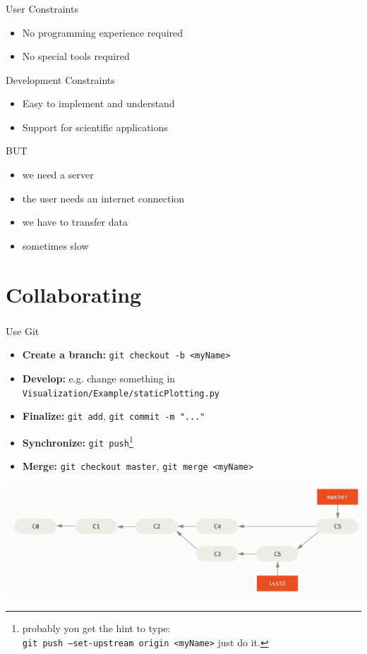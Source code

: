 \documentclass[11pt]{beamer}
\newcommand{\cmark}{\ding{51}}%
\newcommand{\citem}{\item[\textcolor{olive}{\cmark}]}
\newcommand{\mytexttt}[1]{\colorbox{gray!20}{\texttt{#1}}}
\begin{document}
\begin{frame}
\frametitle{\insertsubsection}
\begin{block}{User Constraints}
\begin{itemize}
\citem No programming experience required
\citem No special tools required
\end{itemize}
\end{block}

\begin{block}{Development Constraints}
\begin{itemize}
\citem Easy to implement and understand
\citem Support for scientific applications
\end{itemize}
\end{block}

\begin{block}{BUT}
\begin{itemize}
\item we need a server
\item the user needs an internet connection
\item we have to transfer data
\item sometimes slow
\end{itemize}
\end{block}
\end{frame}

\section{Collaborating}
\frametitle{\insertsubsection}
\begin{frame}
\begin{block}{Use Git}
\begin{itemize}
\item \textbf{Create a branch:} \mytexttt{git checkout -b <myName>}
\item \textbf{Develop:} e.g. change something in \mytexttt{Visualization/Example/staticPlotting.py}
\item \textbf{Finalize:} \mytexttt{git add}, \mytexttt{git commit -m "..."}
\item \textbf{Synchronize:} \mytexttt{git push}\footnote{probably you get the hint to type:\\
\mytexttt{git push --set-upstream origin <myName>} just do it.}
\item \textbf{Merge:} \mytexttt{git checkout master}, \mytexttt{git merge <myName>}
\end{itemize}
\end{block}
\includegraphics[width=\textwidth]{Pictures/branching.png}
\end{frame}
\end{document}
